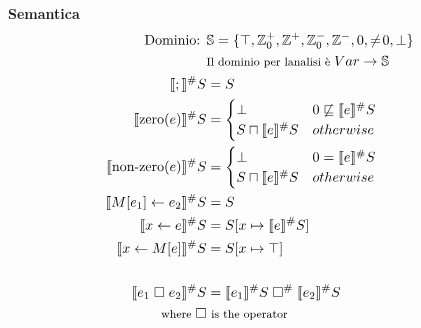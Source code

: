 \documentclass[a4paper,12pt,openany]{article}
\begin{document}
\textbf{Semantica}
\begin{align*}
\mbox{Dominio: }& \mathbb{S}=\{ \top, \mathbb{Z}_0^+, \mathbb{Z}^+, \mathbb{Z}_0^-, \mathbb{Z}^-, 0, \neq\!0, \bot \}\\
&\mbox{\footnotesize Il dominio per lanalisi è} \; Var \rightarrow \mathbb{S}\\
\llbracket ; \rrbracket^\#S &= S\\
\llbracket \mbox{zero}(e) \rrbracket^\#S &= 
\begin{cases}
\bot & 0 \not\sqsubseteq \llbracket e \rrbracket^\#S\\
S\sqcap\llbracket e \rrbracket^\#S & otherwise
\end{cases}\\
\llbracket \mbox{non-zero}(e) \rrbracket^\#S &= 
\begin{cases}
\bot & 0 = \llbracket e \rrbracket^\#S\\
S\sqcap\llbracket e \rrbracket^\#S & otherwise
\end{cases}\\
\llbracket M[e_1]\leftarrow e_2 \rrbracket^\#S &= S\\
\llbracket x \leftarrow e \rrbracket^\#S &= S[x\mapsto\llbracket e \rrbracket^\#S]\\
\llbracket x \leftarrow M[e] \rrbracket^\#S &= S[x\mapsto \top]\\
\\
\llbracket e_1 \;\square\; e_2 \rrbracket^\#S &= \llbracket e_1  \rrbracket^\#S \;\square^\#\; \llbracket e_2 \rrbracket^\#S\\
\mbox{\footnotesize where } \square & \mbox{ \footnotesize is the operator}
\end{align*}
\end{document}
